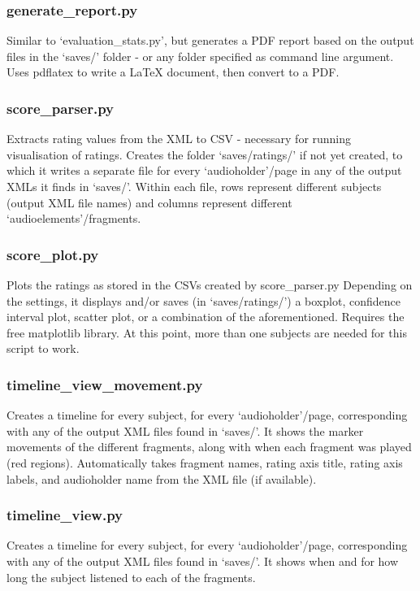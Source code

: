 \documentclass[11pt, oneside]{article}   	%
\begin{document}
		\subsubsection{generate\_report.py}
			Similar to `evaluation\_stats.py', but generates a PDF report based on the output files in the `saves/' folder - or any folder specified as command line argument. Uses pdflatex to write a LaTeX document, then convert to a PDF. 

		\subsubsection{score\_parser.py}
			Extracts rating values from the XML to CSV - necessary for running visualisation of ratings. Creates the folder `saves/ratings/' if not yet created, to which it writes a separate file for every `audioholder'/page in any of the output XMLs it finds in `saves/'. Within each file, rows represent different subjects (output XML file names) and columns represent different `audioelements'/fragments. 

		\subsubsection{score\_plot.py}
			Plots the ratings as stored in the CSVs created by score\_parser.py
			Depending on the settings, it displays and/or saves (in `saves/ratings/') a boxplot, confidence interval plot, scatter plot, or a combination of the aforementioned. 
			Requires the free matplotlib library. 
			At this point, more than one subjects are needed for this script to work. 

		\subsubsection{timeline\_view\_movement.py}
			Creates a timeline for every subject, for every `audioholder'/page, corresponding with any of the output XML files found in `saves/'. It shows the marker movements of the different fragments, along with when each fragment was played (red regions). Automatically takes fragment names, rating axis title, rating axis labels, and audioholder name from the XML file (if available). 

		\subsubsection{timeline\_view.py} %
			Creates a timeline for every subject, for every `audioholder'/page, corresponding with any of the output XML files found in `saves/'. It shows when and for how long the subject listened to each of the fragments. 
\end{document}
